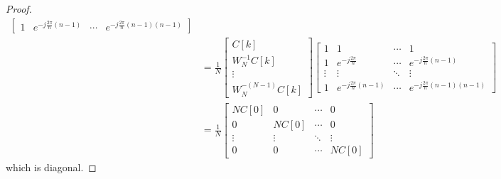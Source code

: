 \documentclass{article}
\begin{document}
\begin{proof}
\begin{align}
\begin{bmatrix}
            1 & e^{-j \frac{2\pi}{n} (n - 1)} & \cdots & e^{-j \frac{2\pi}{n} (n - 1) (n - 1)}
        \end{bmatrix} \\
        &=
        \frac{1}{N} \begin{bmatrix}
            C[k] \\
            W_N^{-1} C[k] \\
            \vdots \\
            W_N^{-(N - 1)} C[k]
        \end{bmatrix}
        \begin{bmatrix}
            1 & 1 & \cdots & 1 \\
            1 & e^{-j \frac{2\pi}{n}} & \cdots & e^{-j \frac{2\pi}{n} (n - 1)} \\
            \vdots & \vdots & \ddots & \vdots \\
            1 & e^{-j \frac{2\pi}{n} (n - 1)} & \cdots & e^{-j \frac{2\pi}{n} (n - 1) (n - 1)}
        \end{bmatrix} \\
        &=
        \frac{1}{N} \begin{bmatrix}
            N C[0] & 0 & \cdots & 0 \\
            0 & N C[0] & \cdots & 0 \\
            \vdots & \vdots & \ddots & \vdots \\
            0 & 0 & \cdots & N C[0]
        \end{bmatrix}
    \end{align}
    which is diagonal.
\end{proof}

\end{document}
